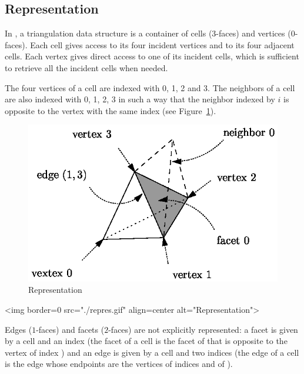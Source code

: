 \subsection{Representation}
\label{TDS3-sec-def}

In \cgal, a triangulation data structure is a
container of cells ($3$-faces) and vertices ($0$-faces). Each cell gives
access to its four incident vertices and to its four adjacent
cells. Each vertex gives direct access to one of its incident cells, which is 
sufficient to retrieve all the incident cells when needed.

The four vertices of a cell are indexed with 0, 1, 2 and 3.  The
neighbors of a cell are also indexed with 0, 1, 2, 3 
in such a way that the neighbor indexed by $i$ is opposite to the vertex
with the same index (see Figure~\ref{TDS3-fig-repres}).

\begin{ccTexOnly}
\begin{figure}
\begin{center} 
\includegraphics{repres.eps}
\end{center}
\caption{Representation \label{TDS3-fig-repres}}
\end{figure} 
\end{ccTexOnly}

\begin{ccHtmlOnly}
<img border=0 src="./repres.gif" align=center
alt="Representation">
\end{ccHtmlOnly}

Edges ($1$-faces) and facets ($2$-faces) are not explicitly
represented: a facet is given by a cell and an index (the facet
 of a cell  is the facet of  that is opposite to
the vertex of index ) and an edge is given by a cell and two
indices (the edge  of a cell  is the edge
whose endpoints are the vertices of indices  and  of
). 

